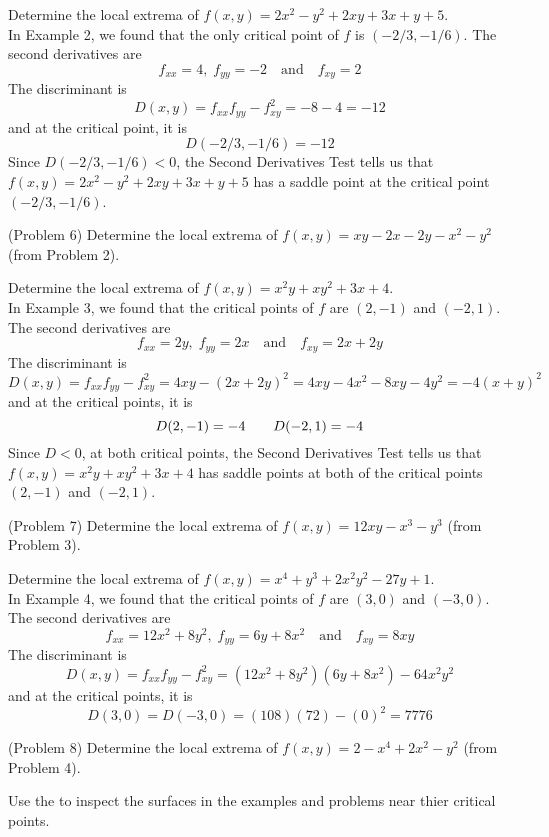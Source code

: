 \documentclass[handout]{ximera}
\begin{document}
\begin{example}[Example 6]
Determine the local extrema of $f(x,y) = 2x^2 - y^2 +2xy + 3x + y+ 5$.\\
In Example 2, we found that the only critical point of $f$ is $(-2/3,-1/6)$.
The second derivatives are
\[
f_{xx} = 4,\; f_{yy} = -2 \quad \text{and} \quad f_{xy} = 2
\]
The discriminant is
\[
D(x,y) = f_{xx} f_{yy} - f_{xy}^2 = -8 -4 = -12
\]
and at the critical point, it is
\[
D(-2/3,-1/6) = -12
\]
Since $D(-2/3,-1/6) < 0$, the Second Derivatives Test tells us that $f(x,y) = 2x^2 - y^2 +2xy + 3x + y+ 5$
has a saddle point at the critical point $(-2/3,-1/6)$.
\end{example}

\begin{problem}(Problem 6)
Determine the local extrema of $f(x,y) = xy - 2x-2y-x^2 - y^2$ (from Problem 2).\\
\end{problem}


\begin{example}[Example 7]
Determine the local extrema of  $f(x,y) = x^2y +xy^2 +3x + 4$.\\
In Example 3, we found that the critical points of $f$ are $(2,-1)$ and $(-2, 1)$.
The second derivatives are
\[
f_{xx} = 2y,\; f_{yy} = 2x \quad \text{and} \quad f_{xy} = 2x + 2y
\]
The discriminant is
\[
D(x,y) = f_{xx} f_{yy} - f_{xy}^2 = 4xy - (2x+2y)^2 = 4xy - 4x^2 - 8xy - 4y^2 = -4(x+y)^2
\]
and at the critical points, it is
\[
D(2, -1) = -4 \quad \text \quad D(-2, 1) = -4
\]
Since $D < 0$, at both critical points, the Second Derivatives Test tells us that $f(x,y) = x^2y +xy^2 +3x + 4$
has saddle points at both of the critical points $(2,-1)$ and $(-2, 1)$.
\end{example}


\begin{problem}(Problem 7)
Determine the local extrema of $f(x,y) = 12xy - x^3 - y^3$ (from Problem 3).\\
\end{problem}



\begin{example}[Example 8]
Determine the local extrema of $f(x,y) = x^4 + y^3 + 2x^2y^2 -27y + 1$.\\
In Example 4, we found that the critical points of $f$ are $(3,0)$ and $(-3,0)$.
The second derivatives are
\[
f_{xx} = 12x^2 + 8y^2,\; f_{yy} = 6y + 8x^2 \quad \text{and} \quad f_{xy} = 8xy
\]
The discriminant is
\[
D(x,y) = f_{xx} f_{yy} - f_{xy}^2 = (12x^2 + 8y^2)(6y + 8x^2) - 64x^2y^2
\]
and at the critical points, it is
\[
D(3, 0) = D(-3,0) = (108)(72) - (0)^2 = 7776
\]
\end{example}

\begin{problem}(Problem 8)
Determine the local extrema of $f(x,y) = 2-x^4 + 2x^2 - y^2$ (from Problem 4).\\
\end{problem}

Use the  to inspect
the surfaces in the examples and problems near thier critical points.
\end{document}
